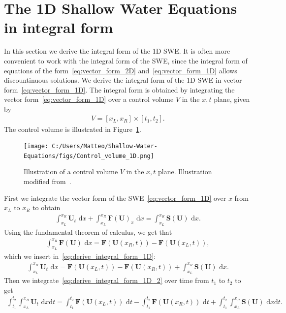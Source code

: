 \section{The 1D Shallow Water Equations in integral form}
In this section we derive the integral form of the 1D SWE.
It is often more convenient to work with the integral form of the SWE, since the integral form of equations of the form~\eqref{eq:vector_form_2D} and~\eqref{eq:vector_form_1D} allows discountinuous solutions.
We derive the integral form of the 1D SWE in vector form~\eqref{eq:vector_form_1D}.
The integral form is obtained by integrating the vector form~\eqref{eq:vector_form_1D} over a control volume $V$ in the $x,t$ plane, given by
\begin{align*}
    V = [x_L, x_R] \times [t_1, t_2].
\end{align*}
The control volume is illustrated in Figure~\ref{fig:control_volume_1D}.
\begin{figure}[H]
    \centering
    \texttt{[image: C:/Users/Matteo/Shallow-Water-Equations/figs/Control\_volume\_1D.png]}
    \caption{Illustration of a control volume $V$ in the $x,t$ plane. Illustration modified from~\cite{Toro2024}.}\label{fig:control_volume_1D}
\end{figure}
First we integrate the vector form of the SWE~\eqref{eq:vector_form_1D} over $x$ from $x_L$ to $x_R$ to obtain
\begin{align}\label{eq:derive_integral_form_1D}
    \int_{x_L}^{x_R} \mathbf{U}_t \text{ d}x + \int_{x_L}^{x_R} \mathbf{F(U)}_x \text{ d}x = \int_{x_L}^{x_R} \mathbf{S(U)} \text{ d}x.
\end{align}
Using the fundamental theorem of calculus, we get that 
\begin{align*}
    \int_{x_L}^{x_R} \mathbf{F}(\mathbf{U}) \text{ d}x = \mathbf{F}(\mathbf{U}(x_R, t)) - \mathbf{F}(\mathbf{U}(x_L, t)),
\end{align*}
which we insert in~\eqref{eq:derive_integral_form_1D}:
\begin{align}\label{eq:derive_integral_form_1D_2}
    \int_{x_L}^{x_R} \mathbf{U}_t \text{ d}x = \mathbf{F}(\mathbf{U}(x_L, t)) - \mathbf{F}(\mathbf{U}(x_R, t)) + \int_{x_L}^{x_R} \mathbf{S(U)} \text{ d}x.
\end{align}
Then we integrate~\eqref{eq:derive_integral_form_1D_2} over time from $t_1$ to $t_2$ to get
\begin{align*}
    \int_{t_1}^{t_2} \int_{x_L}^{x_R} \mathbf{U}_t \text{ d}x \text{d}t = \int_{t_1}^{t_2} \mathbf{F}(\mathbf{U}(x_L, t)) \text{ d}t - \int_{t_1}^{t_2} \mathbf{F}(\mathbf{U}(x_R, t)) \text{ d}t + \int_{t_1}^{t_2} \int_{x_L}^{x_R} \mathbf{S(U)} \text{ d}x \text{d}t.
\end{align*}
